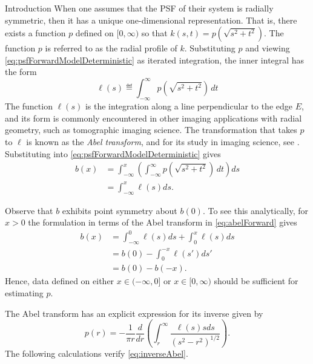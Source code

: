 \begin{chapter}{Introduction}
  When one assumes that the PSF of their system is radially symmetric, then it has a unique one-dimensional representation.
  That is, there exists a function $p$ defined on $[0,\infty)$ so that $k(s,t) = p\left(\sqrt{s^2 + t^2}\right)$.  
  The function $p$ is referred to as the radial profile of $k$.
  Substituting $p$ and viewing \eqref{eq:psfForwardModelDeterministic} as iterated integration, the inner integral has the form
  \begin{equation} \label{eq:abelTransform}
    \ell(s) \eqdef \int_{-\infty}^\infty p\left(\sqrt{s^2 + t^2}\right)\,dt
  \end{equation}
  The function $\ell(s)$ is the integration along a line perpendicular to the edge $E$, and its form is commonly encountered in other imaging applications with radial geometry, such as tomographic imaging science.
  The transformation that takes $p$ to $\ell$ is known as the \emph{Abel transform}, and for its study in imaging science, see \citep{bracewell,epstein2008,knill93}.
  Substituting into \eqref{eq:psfForwardModelDeterministic} gives
  \begin{align}
    b(x) &= \int_{-\infty}^x \left(\int_{-\infty}^\infty p\left(\sqrt{s^2 + t^2}\right)\,dt\right)ds \nonumber \\
         &= \int_{-\infty}^x \ell(s)ds. \label{eq:abelForward}
  \end{align}

  Observe that $b$ exhibits point symmetry about $b(0)$.
  To see this analytically, for $x>0$ the formulation in terms of the Abel transform in \eqref{eq:abelForward} gives
  \begin{align}
    b(x) &= \int_{-\infty}^0 \ell(s)ds + \int_0^x \ell(s)ds \nonumber \\
         &= b(0) - \int_0^{-x}\ell(s')ds'  \nonumber \\
         &= b(0) - b(-x).
  \end{align}
  Hence, data defined on either $x\in(-\infty,0]$ or $x\in[0,\infty)$ should be sufficient for estimating $p$.

  The Abel transform has an explicit expression for its inverse given by
  \begin{equation} \label{eq:inverseAbel}
    p(r) = -\frac{1}{\pi r} \frac{d}{dr}\left(\int_r^\infty \frac{\ell(s) s ds}{ (s^2 - r^2)^{1/2} } \right).  
  \end{equation} 
  The following calculations verify \eqref{eq:inverseAbel}.


\end{chapter}
